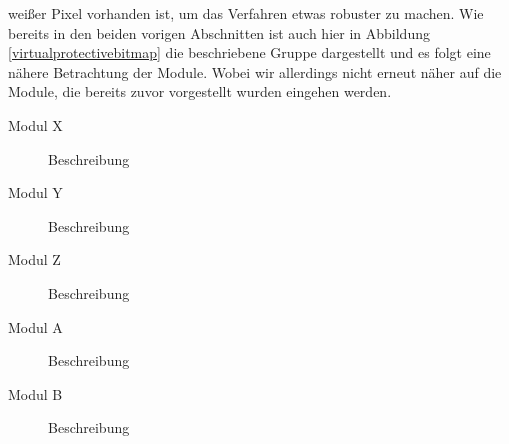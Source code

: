  weißer Pixel vorhanden ist, um das Verfahren etwas robuster zu machen.
 Wie bereits in den beiden vorigen Abschnitten  ist auch hier in Abbildung \ref{virtualprotectivebitmap}
 die beschriebene Gruppe dargestellt und es folgt eine nähere Betrachtung der Module.
 Wobei wir allerdings nicht erneut näher auf die Module, die bereits zuvor
 vorgestellt wurden eingehen werden.


\begin{description}
\item[Modul X] Beschreibung
\item[Modul Y] Beschreibung
\item[Modul Z] Beschreibung
\item[Modul A] Beschreibung
\item[Modul B] Beschreibung
\end{description}
